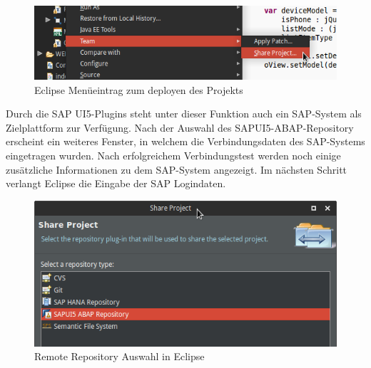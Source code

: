 \vspace{1em}
\begin{figure}[htb]
  \centering
  \includegraphics[width=0.8\linewidth]{abb/eclipse_share_project}
  \caption[Eclipse Menüeintrag zum deployen des Projekts]{Eclipse Menüeintrag zum deployen des Projekts}
  \label{fig:eclipseshare}
\end{figure}

Durch die SAP UI5-Plugins steht unter dieser Funktion auch ein SAP-System als Zielplattform zur Verfügung. Nach der Auswahl des SAPUI5-ABAP-Repository erscheint ein weiteres Fenster, in welchem die Verbindungsdaten des SAP-Systems eingetragen wurden. Nach erfolgreichem Verbindungstest werden noch einige zusätzliche Informationen zu dem SAP-System angezeigt. Im nächsten Schritt verlangt Eclipse die Eingabe der SAP Logindaten.

\vspace{1em}
\begin{figure}[htb]
  \centering
  \includegraphics[width=0.8\linewidth]{abb/eclipse_share_project_window}
  \caption[Remote Repository Auswahl in Eclipse]{Remote Repository Auswahl in Eclipse}
  \label{fig:eclipsesharewindow}
\end{figure}


